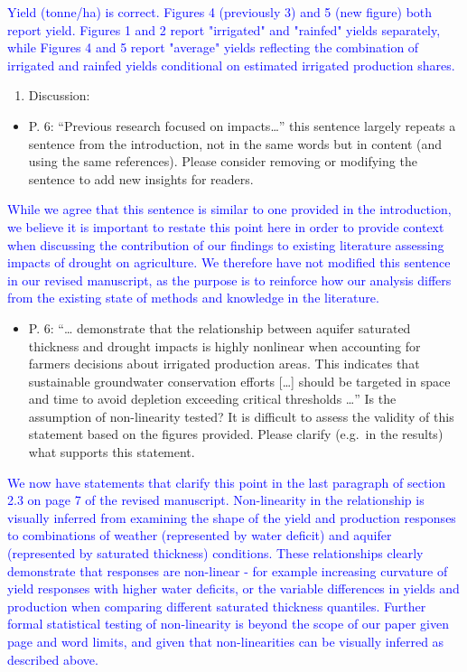 \documentclass[
]{article}
\providecommand{\tightlist}{%
  \setlength{\itemsep}{0pt}\setlength{\parskip}{0pt}}
\begin{document}
\textcolor{blue}{Yield (tonne/ha) is correct. Figures 4 (previously 3) and 5 (new figure) both report yield. Figures 1 and 2 report "irrigated" and "rainfed" yields separately, while Figures 4 and 5 report "average" yields reflecting the combination of irrigated and rainfed yields conditional on estimated irrigated production shares.}

\begin{enumerate}
\def\labelenumi{\arabic{enumi}.}
\setcounter{enumi}{4}
\tightlist
\item
  Discussion:
\end{enumerate}

\begin{itemize}
\tightlist
\item
  P. 6: ``Previous research focused on impacts\ldots{}'' this sentence
  largely repeats a sentence from the introduction, not in the same
  words but in content (and using the same references). Please consider
  removing or modifying the sentence to add new insights for readers.
\end{itemize}

\textcolor{blue}{While we agree that this sentence is similar to one provided in the introduction, we believe it is important to restate this point here in order to provide context when discussing the contribution of our findings to existing literature assessing impacts of drought on agriculture. We therefore have not modified this sentence in our revised manuscript, as the purpose is to reinforce how our analysis differs from the existing state of methods and knowledge in the literature.}

\begin{itemize}
\tightlist
\item
  P. 6: ``\ldots{} demonstrate that the relationship between aquifer
  saturated thickness and drought impacts is highly nonlinear when
  accounting for farmers decisions about irrigated production areas.
  This indicates that sustainable groundwater conservation efforts
  {[}\ldots{]} should be targeted in space and time to avoid depletion
  exceeding critical thresholds \ldots{}'' Is the assumption of
  non-linearity tested? It is difficult to assess the validity of this
  statement based on the figures provided. Please clarify (e.g.~in the
  results) what supports this statement.
\end{itemize}

\textcolor{blue}{We now have statements that clarify this point in the last paragraph of section 2.3 on page 7 of the revised manuscript. Non-linearity in the relationship is visually inferred from examining the shape of the yield and production responses to combinations of weather (represented by water deficit) and aquifer (represented by saturated thickness) conditions. These relationships clearly demonstrate that responses are non-linear - for example increasing curvature of yield responses with higher water deficits, or the variable differences in yields and production when comparing different saturated thickness quantiles. Further formal statistical testing of non-linearity is beyond the scope of our paper given page and word limits, and given that non-linearities can be visually inferred as described above.}
\end{document}
